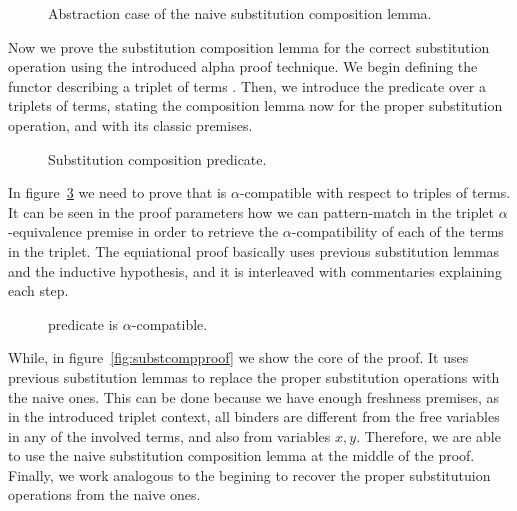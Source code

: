 \documentclass{book}
\newcommand{\alp}{\ensuremath{\alpha}}
\begin{document}
{%
  
\begin{figure}[h]
  
  \caption{Abstraction case of the naive substitution composition lemma.}
\label{fig:absnaivesubstproofcase}
\end{figure}

Now we prove the substitution composition lemma for the correct substitution operation using the introduced alpha proof technique. We begin defining the functor describing a triplet of terms . Then, we introduce the predicate  over a triplets of terms, stating the composition lemma now for the proper substitution operation, and with its classic premises.

  
\begin{figure}[h!]
  \caption{Substitution composition predicate.}
\label{fig:substcomppred}
\end{figure}

In figure~\ref{fig:alpcompatible} we need to prove that  is \alp-compatible with respect to triples of terms. It can be seen in the proof parameters how we can pattern-match in the triplet \alp-equivalence premise in order to retrieve the \alp-compatibility of each of the terms in the triplet. The equiational proof basically uses previous substitution lemmas and the inductive hypothesis, and it is interleaved with commentaries explaining each step.

\begin{figure}[h!]
  \caption{ predicate is \alp-compatible.}
\label{fig:alpcompatible}
\end{figure}

While, in figure~\ref{fig:substcompproof} we show the core of the proof. It uses previous substitution lemmas to replace the proper substitution operations with the naive ones. This can be done because we have enough freshness premises, as in the introduced triplet context, all binders are different from the free variables in any of the involved terms, and also from variables $x,y$. Therefore, we are able to use the naive substitution composition lemma at the middle of the proof. Finally, we work analogous to the begining to recover the proper substitutuion operations from the naive ones. 

}
\end{document}
